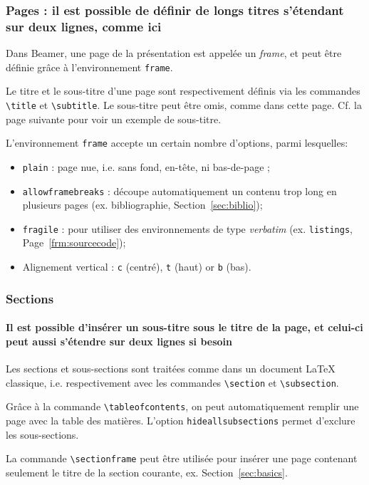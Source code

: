 \documentclass[10pt,    %
    french,             %
    xcolor=table,       %
    envcountsect,       %
    aspectratio=43      %
]{beamer}
\begin{document}
\begin{frame}
    \frametitle{Pages : il est possible de définir de longs titres s'étendant sur deux lignes, comme ici} 
    
    Dans Beamer, une page de la présentation est appelée un \textit{frame}, et peut être définie grâce à l'environnement \texttt{frame}.
    
    \vspace{0.25cm}
    Le titre et le sous-titre d'une page sont respectivement définis via les commandes \texttt{\textbackslash{}title} et \texttt{\textbackslash{}subtitle}. Le sous-titre peut être omis, comme dans cette page. Cf. la page suivante pour voir un exemple de sous-titre.
    
    \vspace{0.25cm}
    L'environnement \texttt{frame} accepte un certain nombre d'options, parmi lesquelles: 
    \begin{itemize}
        \item \texttt{plain} : page nue, i.e. sans fond, en-tête, ni bas-de-page ;
        \item \texttt{allowframebreaks} : découpe automatiquement un contenu trop long en plusieurs pages (ex. bibliographie, Section~\ref{sec:biblio});
        \item \texttt{fragile} : pour utiliser des environnements de type \textit{verbatim} (ex. \texttt{listings}, Page~\ref{frm:sourcecode});
        \item Alignement vertical : \texttt{c} (centré), \texttt{t} (haut) or \texttt{b} (bas).
    \end{itemize}
\end{frame}

\begin{frame}
    \frametitle{Sections} 
    \framesubtitle{Il est possible d'insérer un sous-titre sous le titre de la page, et celui-ci peut aussi s'étendre sur deux lignes si besoin}
    
    Les sections et sous-sections sont traitées comme dans un document \LaTeX{} classique, i.e. respectivement avec les commandes \texttt{\textbackslash{}section} et \texttt{\textbackslash{}subsection}.
    
    \vspace{0.25cm}
    Grâce à la commande \texttt{\textbackslash{}tableofcontents}, on peut automatiquement remplir une page avec la table des matières. L'option \texttt{hideallsubsections} permet d'exclure les sous-sections.
    
    \vspace{0.25cm}
    La commande \texttt{\textbackslash{}sectionframe} peut être utilisée pour insérer une page contenant seulement le titre de la section courante, ex. Section~\ref{sec:basics}.
\end{frame}
\end{document}
